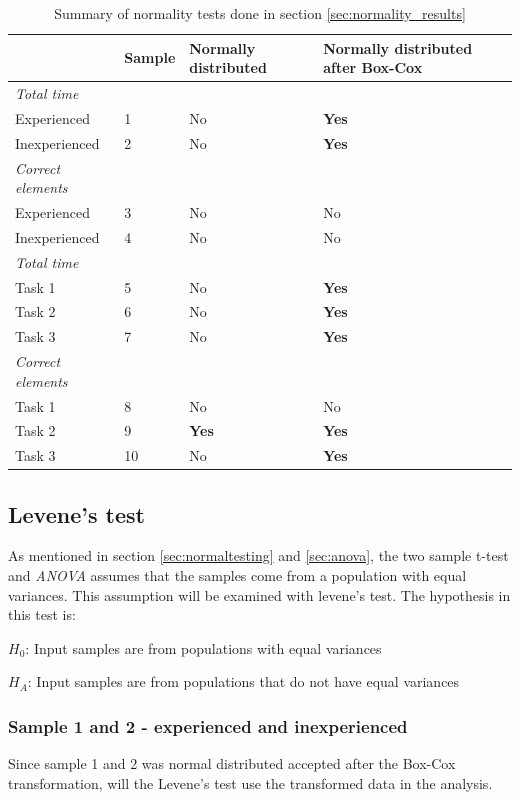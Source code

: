 \begin{table}[H]
	\centering
	\begin{tabular}{l|l|l|l}
		  & Sample & Normally distributed  & Normally distributed after Box-Cox  \\ \hline
		\textit{Total time} & & & \\
		Experienced & 1 &No   & \textbf{Yes}   \\
		Inexperienced  & 2 & No & \textbf{Yes}     \\ \hline
		\textit{Correct elements} & & & \\
		Experienced & 3 & No  & No   \\
		Inexperienced  & 4 & No & No   \\ \hline
		\textit{Total time }& & & \\
		Task 1 & 5 &No  & \textbf{Yes}  \\
		Task 2 & 6 &No  & \textbf{Yes}   \\
		Task 3 & 7 & No & \textbf{Yes}  \\ \hline
		\textit{Correct elements} & & & \\
		Task 1 & 8 & No  & No  \\
		Task 2 & 9 &\textbf{Yes}  & \textbf{Yes}   \\
		Task 3 & 10 & No & \textbf{Yes}  \\ \hline
	\end{tabular}
	\caption[Summary, normality tests]{Summary of normality tests done in section \ref{sec:normality_results}}
	\label{tab:normaltest_summary}
\end{table}

\subsection{Levene's test}
As mentioned in section \ref{sec:normaltesting} and \ref{sec:anova}, the two sample t-test and \textit{ANOVA} assumes that the samples come from a population with equal variances. This assumption will be examined with levene's test. The hypothesis in this test is: \\[0.5cm]

\centerline{$H_{0}$: Input samples are from populations with equal variances} 
\centerline{$H_{A}$: Input samples are from populations that do not have equal variances}

\subsubsection[Sample 1 and 2]{Sample 1 and 2 - experienced and inexperienced}\label{sec:sample1,2}
Since sample 1 and 2 was normal distributed accepted after the Box-Cox transformation, will the Levene's test use the transformed data in the analysis. 

